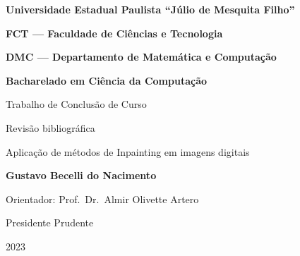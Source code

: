 \thispagestyle{empty}
\begin{center}
\bf{Universidade Estadual Paulista ``Júlio de Mesquita Filho''}
  
  \bf{FCT — Faculdade de Ciências e Tecnologia}
  
  \bf{DMC — Departamento de Matemática e Computação}
  
  \bf{Bacharelado em Ciência da Computação}
  
  \vspace*{\fill}
  \vspace{42pt}
  \Large{	\textmd{Trabalho de Conclusão de Curso}}
    
  \large{Revisão bibliográfica}
  
  \vspace{42pt}
  \Large{Aplicação de métodos de Inpainting em imagens digitais}
  
  \vspace{42pt}
  \normalsize{\bf{Gustavo Becelli do Nacimento}
  
  \vspace{12pt}
  Orientador: \textmd{Prof.\ Dr.\ Almir Olivette Artero}}
  
  \vspace*{\fill}
  \vspace{12pt}
  Presidente Prudente
  
  2023
\end{center}